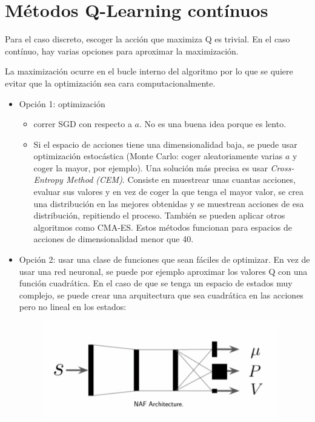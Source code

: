 \section{Métodos Q-Learning contínuos}%
\label{sec:métodos_q_learning_contínuos}

Para el caso discreto, escoger la acción que maximiza Q es trivial. En el caso contínuo, hay
varias opciones para aproximar la maximización.

La maximización ocurre en el bucle interno del algoritmo por lo que se quiere evitar que la
optimización sea cara computacionalmente.

\begin{itemize}
    \item Opción 1: optimización
        \begin{itemize}
            \item correr SGD con respecto a $a$. No es una buena idea porque es lento.
            \item Si el espacio de acciones tiene una dimensionalidad baja, se puede usar
                optimización estocástica (Monte Carlo: coger aleatoriamente varias $a$ y coger
                la mayor, por ejemplo). Una solución más precisa es usar
                \textit{Cross-Entropy Method (CEM)}. Consiste en muestrear unas cuantas
                acciones, evaluar sus valores y en vez de coger la que tenga el mayor valor, se
                crea una distribución en las mejores obtenidas y se muestrean acciones
                de esa distribución, repitiendo el proceso. También se pueden aplicar otros
                algoritmos como CMA-ES. Estos métodos funcionan para espacios de acciones
                de dimensionalidad menor que 40.
        \end{itemize}
    \item Opción 2: usar una clase de funciones que sean fáciles de optimizar. En vez de
        usar una red neuronal, se puede por ejemplo aproximar los valores Q con una función
        cuadrática. En el caso de que se tenga un espacio de estados muy complejo, se puede
        crear una arquitectura que sea cuadrática en las acciones pero no lineal en los
        estados:
\begin{figure}[H]
	\centering
	\includegraphics[width=0.4\linewidth]{figures/2020-06-16-185156_388x158_scrot.png}

\end{figure}
\end{itemize}

